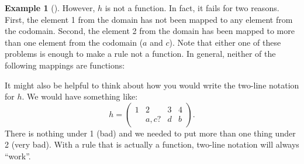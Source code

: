 \documentclass[10pt,]{memoir}
\theoremstyle{plain}
\theoremstyle{definition}
\newtheorem{example}[theorem]{Example}
\theoremstyle{definition}
\theoremstyle{definition}
\numberwithin{equation}{chapter}
\newcounter{figstack}
\newcounter{figindex}
\newlength\fight
\newcommand\pushValignCaptionBottom[5][b]{%
\stepcounter{figstack}%
\expandafter\def\csname %
figalign\romannumeral\value{figstack}\endcsname{#1}%
\expandafter\def\csname %
figtype\romannumeral\value{figstack}\endcsname{#2}%
\expandafter\def\csname %
figwd\romannumeral\value{figstack}\endcsname{#3}%
\expandafter\def\csname %
figcontent\romannumeral\value{figstack}\endcsname{#4}%
\expandafter\def\csname %
figcap\romannumeral\value{figstack}\endcsname{#5}%
\setbox0=\hbox{%
\begin{#2}{#3}#4\end{#2}}%
\ifdim\dimexpr\ht0+\dp0\relax>\fight\global\setlength{\fight}{%
\dimexpr\ht0+\dp0\relax}\fi%
}
\newcommand\popValignCaptionBottom{%
\setcounter{figindex}{0}%
\hfill%
\whiledo{\value{figindex}<\value{figstack}}{%
\stepcounter{figindex}%
\def\tmp{\csname figwd\romannumeral\value{figindex}\endcsname}%
\begin{\csname figtype\romannumeral\value{figindex}\endcsname}[t]{\tmp}%
\centering%
\stackinset{c}{}%
{\csname figalign\romannumeral\value{figindex}\endcsname}{}%
{\csname figcontent\romannumeral\value{figindex}\endcsname}%
{\rule{0pt}{\fight}}\par%
\csname figcap\romannumeral\value{figindex}\endcsname%
\end{\csname figtype\romannumeral\value{figindex}\endcsname}%
\hfill%
}%
\setcounter{figstack}{0}%
\setlength{\fight}{0pt}%
\hfill%
}
\newcommand{\amp}{ & }
\begin{document}
\begin{example}[]
\par

          However, \(h\) is not a function. In fact, it fails for two reasons. First, the element 1 from the domain has not been mapped to any element from the codomain. Second, the element 2 from the domain has been mapped to more than one element from the codomain (\(a\) and \(c\)). Note that either one of these problems is enough to make a rule not a function. In general, neither of the following mappings are functions:
\leavevmode%
\par

          It might also be helpful to think about how you would write the two-line notation for \(h\). We would have something like:
          \begin{equation*}
            h=\begin{pmatrix} 1 \amp 2 \amp 3 \amp 4 \\ \amp a,c? \amp d \amp b\end{pmatrix}.
          \end{equation*}
          There is nothing under 1 (bad) and we needed to put more than one thing under 2 (very bad). With a rule that is actually a function, two-line notation will always ``work''.
\end{example}
\typeout{************************************************}
\typeout{************************************************}
\end{document}
